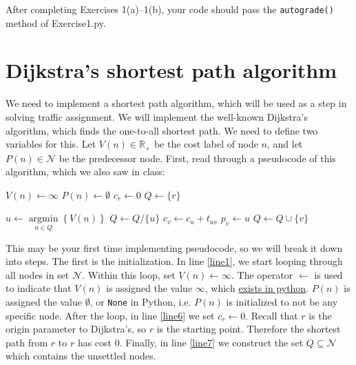 \documentclass[11pt]{article}
\newcommand{\N}{\mathcal{N}}
\newcommand{\A}{\mathcal{A}}
\DeclareMathOperator*{\argmin}{\arg\min}
\begin{document}
\vspace\baselineskip

\noindent
After completing Exercises 1(a)--1(b), your code should pass the \texttt{autograde()} method of Exercise1.py. 



\section{Dijkstra's shortest path algorithm}


We need to implement a shortest path algorithm, which will be used as a step in solving traffic assignment. We will implement the well-known Dijkstra's algorithm, which finds the one-to-all shortest path. We need to define two variables for this. Let $V(n)\in\mathbb{R}_+$ be the cost label of node $n$, and let $P(n)\in\N$ be the predecessor node. First, read through a pseudocode of this algorithm, which we also saw in class:


\vspace{\baselineskip}


\begin{algorithmic}[1]
	\For{$n\in \N$}  \label{line1}
	\State $V(n) \leftarrow \infty$
	\State $P(n) \leftarrow \emptyset$
	\EndFor
	\State $c_r \leftarrow 0$ \label{line6}
	\State  $Q\leftarrow \{r\}$ \label{line7}
	
	\vspace{0.5\baselineskip}
	
	  \label{line8}
	\State $u\leftarrow \argmin\limits_{n\in Q} \left\{ V(n)\right\}$ \label{line9}
	\State $Q\leftarrow Q/\{u\}$
	\For{$(u,v)\in\A$} \label{line10}
	  \label{line11}
	\State $c_v \leftarrow c_u + t_{uv}$  \label{line12}
	\State $p_v \leftarrow u$
	\State $Q\leftarrow Q\cup \{v\}$ \label{line14}
	\EndIf
	\EndFor
	\EndWhile \label{line17}
	\EndProcedure 
	
\end{algorithmic}

\vspace{\baselineskip}

\noindent This may be your first time implementing pseudocode, so we will break it down into steps. The first is the initialization. In line \ref{line1}, we start looping through all nodes in set $\N$. Within this loop, set $V(n) \leftarrow \infty$. The operator $\leftarrow$ is used to indicate that $V(n)$ is assigned the value $\infty$, which \href{https://www.w3schools.com/python/ref_math_inf.asp}{exists in python}. $P(n)$ is assigned the value $\emptyset$, or \texttt{None} in Python, i.e. $P(n)$ is initialized to not be any specific node. After the loop, in line \ref{line6} we set $c_r\leftarrow 0$. Recall that $r$ is the origin parameter to Dijkstra's, so $r$ is the starting point. Therefore the shortest path from $r$ to $r$ has cost $0$. Finally, in line \ref{line7} we construct the set $Q\subseteq\N$ which contains the unsettled nodes. 
\end{document}
